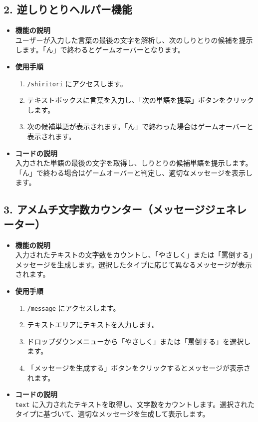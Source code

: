 \documentclass{article}
\begin{document}
\subsection*{2. 逆しりとりヘルパー機能}
\begin{itemize}
    \item \textbf{機能の説明} \\
    ユーザーが入力した言葉の最後の文字を解析し、次のしりとりの候補を提示します。「ん」で終わるとゲームオーバーとなります。
    
    \item \textbf{使用手順} \\
    \begin{enumerate}
        \item \texttt{/shiritori} にアクセスします。
        \item テキストボックスに言葉を入力し、「次の単語を提案」ボタンをクリックします。
        \item 次の候補単語が表示されます。「ん」で終わった場合はゲームオーバーと表示されます。
    \end{enumerate}
    
    \item \textbf{コードの説明} \\
    入力された単語の最後の文字を取得し、しりとりの候補単語を提示します。「ん」で終わる場合はゲームオーバーと判定し、適切なメッセージを表示します。
\end{itemize}

\subsection*{3. アメムチ文字数カウンター（メッセージジェネレーター）}
\begin{itemize}
    \item \textbf{機能の説明} \\
    入力されたテキストの文字数をカウントし、「やさしく」または「罵倒する」メッセージを生成します。選択したタイプに応じて異なるメッセージが表示されます。
    
    \item \textbf{使用手順} \\
    \begin{enumerate}
        \item \texttt{/message} にアクセスします。
        \item テキストエリアにテキストを入力します。
        \item ドロップダウンメニューから「やさしく」または「罵倒する」を選択します。
        \item 「メッセージを生成する」ボタンをクリックするとメッセージが表示されます。
    \end{enumerate}
    
    \item \textbf{コードの説明} \\
    \texttt{text} に入力されたテキストを取得し、文字数をカウントします。選択されたタイプに基づいて、適切なメッセージを生成して表示します。
\end{itemize}
\end{document}
